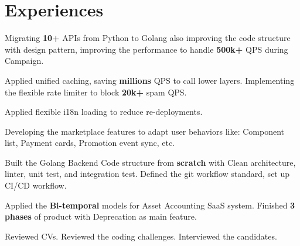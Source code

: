 \documentclass[]{deedy-resume-openfont}
\begin{document}
\hfill
\begin{minipage}[t]{0.69\textwidth} 


\section{Experiences}
\vspace{\topsep} %
\begin{tightemize}
\item Migrating \textbf{10+} APIs from Python to Golang also improving the code structure with design pattern, improving the performance to handle  \textbf{500k+} QPS during Campaign.
\item Applied unified caching, saving  \textbf{millions} QPS to call lower layers. Implementing the flexible rate limiter to block \textbf{20k+} spam QPS. 
\item Applied flexible i18n loading to reduce re-deployments.
\item Developing the marketplace features to adapt user behaviors like: Component list, Payment cards, Promotion event sync, etc.
\end{tightemize}
\sectionsep

\vspace{\topsep} %
\begin{tightemize}
\item Built the Golang Backend Code structure from \textbf{scratch} with Clean architecture, linter, unit test, and integration test. Defined the git workflow standard, set up CI/CD workflow. 
\item Applied the  \textbf{Bi-temporal} models for Asset Accounting SaaS system. Finished \textbf{3 phases} of product with Deprecation as main feature.
\item Reviewed CVs. Reviewed the coding challenges. Interviewed the candidates.
\end{tightemize}
\sectionsep


\end{minipage}
\end{document}
